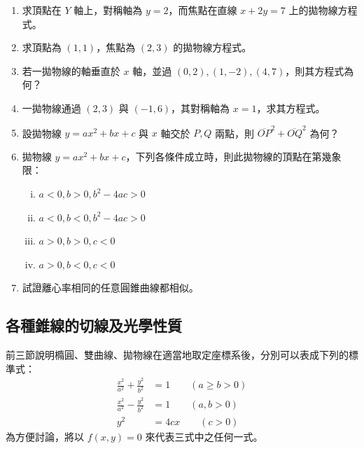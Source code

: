 \begin{enumerate}
  \item 求頂點在 $Y$ 軸上，對稱軸為 $y=2$，而焦點在直線 $x + 2y = 7$ 上的拋物線方程式。

  \item 求頂點為 $(1,1)$，焦點為 $(2,3)$ 的拋物線方程式。

  \item[*\theenumi.] 若一拋物線的軸垂直於 $x$ 軸，並過 $(0,2), (1,-2), (4,7)$，則其方程式為何？

  \item 一拋物線通過 $(2,3)$ 與 $(-1,6)$，其對稱軸為 $x=1$，求其方程式。

  \item 設拋物線 $y = ax^2 + bx + c$ 與 $x$ 軸交於 $P, Q$ 兩點，則 $\overline{OP}^2 + \overline{OQ}^2$ 為何？

  \item 拋物線 $y = ax^2 + bx + c$，下列各條件成立時，則此拋物線的頂點在第幾象限：
  \begin{enumerate}[(i)]
    \item $a < 0, b > 0, b^2 - 4ac > 0$
    \item $a < 0, b < 0, b^2 - 4ac > 0$
    \item $a > 0, b > 0, c < 0$
    \item $a > 0, b < 0, c < 0$
  \end{enumerate}

  \item 試證離心率相同的任意圓錐曲線都相似。
\end{enumerate}

\subsection{各種錐線的切線及光學性質}
\label{sec:b4s-3-4}

前三節說明橢圓、雙曲線、拋物線在適當地取定座標系後，分別可以表成下列的標準式：
\begin{align}
\frac{x^2}{a^2} + \frac{y^2}{b^2} &= 1 \qquad (a \ge b > 0) \label{eq:b4s-3-4-1} \\
\frac{x^2}{a^2} - \frac{y^2}{b^2} &= 1 \qquad (a, b > 0) \label{eq:b4s-3-4-2} \\
y^2 &= 4cx \qquad (c > 0) \label{eq:b4s-3-4-3}
\end{align}
為方便討論，將以 $f(x,y) = 0$ 來代表三式中之任何一式。

